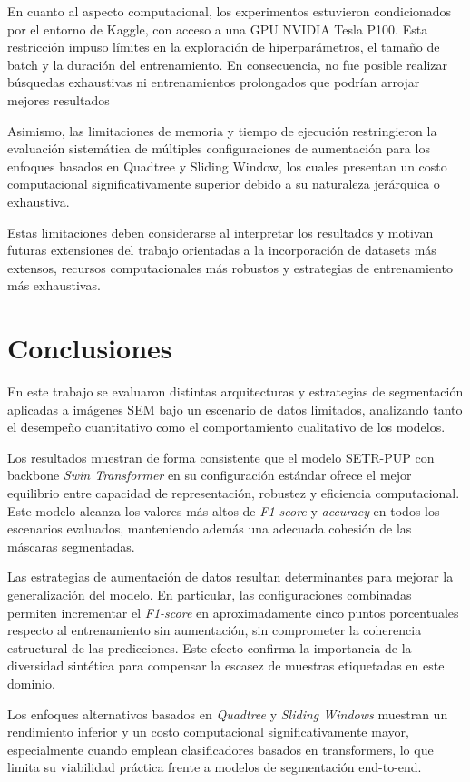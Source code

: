 \documentclass[onecolumn, 12pt , journal]{IEEEtran}
\begin{document}
En cuanto al aspecto computacional, los experimentos estuvieron condicionados por el entorno de Kaggle, con acceso a una GPU NVIDIA Tesla P100. Esta restricción impuso límites en la exploración de hiperparámetros, el tamaño de batch y la duración del entrenamiento. En consecuencia, no fue posible realizar búsquedas exhaustivas ni entrenamientos prolongados que podrían arrojar mejores resultados

Asimismo, las limitaciones de memoria y tiempo de ejecución restringieron la evaluación sistemática de múltiples configuraciones de aumentación para los enfoques basados en Quadtree y Sliding Window, los cuales presentan un costo computacional significativamente superior debido a su naturaleza jerárquica o exhaustiva.

Estas limitaciones deben considerarse al interpretar los resultados y motivan futuras extensiones del trabajo orientadas a la incorporación de datasets más extensos, recursos computacionales más robustos y estrategias de entrenamiento más exhaustivas.


\section{Conclusiones}

En este trabajo se evaluaron distintas arquitecturas y estrategias de segmentación aplicadas a imágenes SEM bajo un escenario de datos limitados, analizando tanto el desempeño cuantitativo como el comportamiento cualitativo de los modelos.

Los resultados muestran de forma consistente que el modelo SETR-PUP con backbone \emph{Swin Transformer} en su configuración estándar ofrece el mejor equilibrio entre capacidad de representación, robustez y eficiencia computacional. Este modelo alcanza los valores más altos de \emph{F1-score} y \emph{accuracy} en todos los escenarios evaluados, manteniendo además una adecuada cohesión de las máscaras segmentadas.

Las estrategias de aumentación de datos resultan determinantes para mejorar la generalización del modelo. En particular, las configuraciones combinadas permiten incrementar el \emph{F1-score} en aproximadamente cinco puntos porcentuales respecto al entrenamiento sin aumentación, sin comprometer la coherencia estructural de las predicciones. Este efecto confirma la importancia de la diversidad sintética para compensar la escasez de muestras etiquetadas en este dominio.

Los enfoques alternativos basados en \emph{Quadtree} y \emph{Sliding Windows} muestran un rendimiento inferior y un costo computacional significativamente mayor, especialmente cuando emplean clasificadores basados en transformers, lo que limita su viabilidad práctica frente a modelos de segmentación end-to-end.
\end{document}
